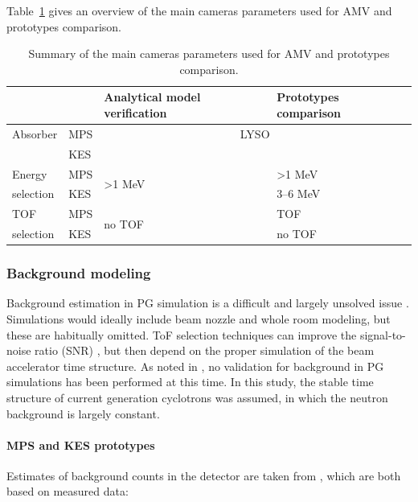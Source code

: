\documentclass[a4paper,english]{article}
\begin{document}
Table~\ref{table:FOM} gives an overview of the main cameras parameters used for AMV and prototypes comparison.

\begin{table}
\centering
\begin{tabular}{|l|l|l|l|}
	\hline
	\multicolumn{2}{|c|}{}& 	Analytical model verification & Prototypes comparison\\
	\hline
	Absorber				& MPS & \multicolumn{2}{c|}{LYSO} \\
									& KES & 	\multicolumn{2}{c|}{} \\
	\hline
	Energy & MPS & \multirow{2}{*}{>1 MeV}			&		>1 MeV						\\
	\cline{2-2}\cline{4-4}
	selection				& KES & & 3--6 MeV \\
	\hline	
	TOF & MPS & \multirow{2}{*}{no TOF}			&		TOF						\\
	\cline{2-2}\cline{4-4}
	selection				& KES & & no TOF \\
	\hline		
\end{tabular}
\caption{Summary of the main cameras parameters used for AMV and prototypes comparison.}
\label{table:FOM}
\end{table}

\subsubsection{Background modeling}

Background estimation in PG simulation is a difficult and largely unsolved issue \citep{Huisman2016,Sterpin2015,Pinto2014a,Perali2014}. Simulations would ideally include beam nozzle and whole room modeling, but these are habitually omitted. ToF selection techniques can improve the signal-to-noise ratio (SNR) \citep{Testa2008,Roellinghoff2014a}, but then depend on the proper simulation of the beam accelerator time structure. As noted in \cite{Huisman2016}, no validation for background in PG simulations has been performed at this time. In this study, the stable time structure of current generation cyclotrons was assumed, in which the neutron background is largely constant. 

\paragraph{MPS and KES prototypes}
Estimates of background counts in the detector are taken from \cite{Pinto2014a,Perali2014}, which are both based on measured data:
\end{document}
